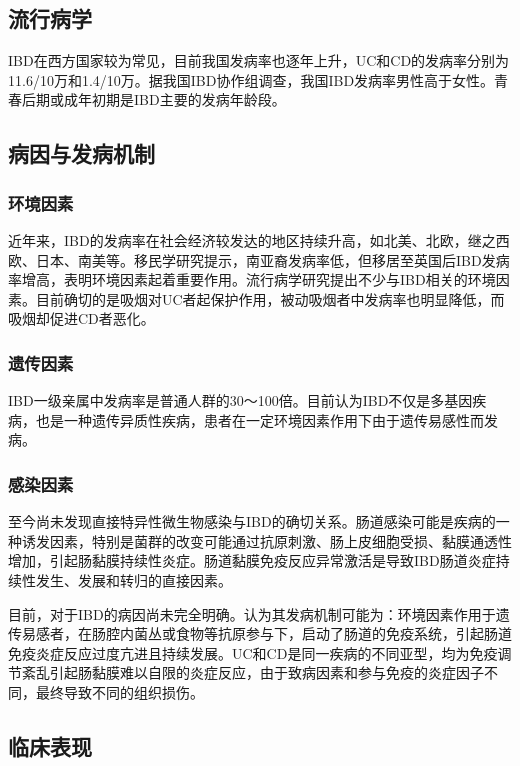 \subsection{流行病学}

IBD在西方国家较为常见，目前我国发病率也逐年上升，UC和CD的发病率分别为11.6/10万和1.4/10万。据我国IBD协作组调查，我国IBD发病率男性高于女性。青春后期或成年初期是IBD主要的发病年龄段。

\subsection{病因与发病机制}

\subsubsection{环境因素}

近年来，IBD的发病率在社会经济较发达的地区持续升高，如北美、北欧，继之西欧、日本、南美等。移民学研究提示，南亚裔发病率低，但移居至英国后IBD发病率增高，表明环境因素起着重要作用。流行病学研究提出不少与IBD相关的环境因素。目前确切的是吸烟对UC者起保护作用，被动吸烟者中发病率也明显降低，而吸烟却促进CD者恶化。

\subsubsection{遗传因素}

IBD一级亲属中发病率是普通人群的30～100倍。目前认为IBD不仅是多基因疾病，也是一种遗传异质性疾病，患者在一定环境因素作用下由于遗传易感性而发病。

\subsubsection{感染因素}

至今尚未发现直接特异性微生物感染与IBD的确切关系。肠道感染可能是疾病的一种诱发因素，特别是菌群的改变可能通过抗原刺激、肠上皮细胞受损、黏膜通透性增加，引起肠黏膜持续性炎症。肠道黏膜免疫反应异常激活是导致IBD肠道炎症持续性发生、发展和转归的直接因素。

目前，对于IBD的病因尚未完全明确。认为其发病机制可能为：环境因素作用于遗传易感者，在肠腔内菌丛或食物等抗原参与下，启动了肠道的免疫系统，引起肠道免疫炎症反应过度亢进且持续发展。UC和CD是同一疾病的不同亚型，均为免疫调节紊乱引起肠黏膜难以自限的炎症反应，由于致病因素和参与免疫的炎症因子不同，最终导致不同的组织损伤。

\subsection{临床表现}

